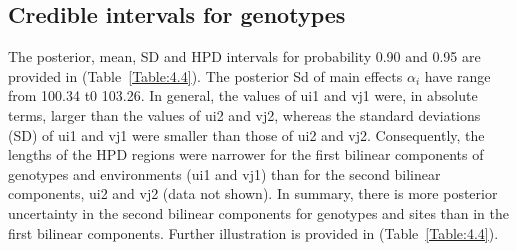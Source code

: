 \subsection{Credible intervals for genotypes}
The posterior, mean, SD and HPD intervals for probability 0.90 and 0.95 are provided in (Table~\ref{Table:4.4}). The posterior Sd of main effects $\alpha_i$ have range from 100.34 t0 103.26.
In general, the values of ui1 and vj1 were, in absolute terms, larger than the values
of ui2 and vj2, whereas the standard deviations (SD) of ui1 and vj1 were smaller than
those of ui2 and vj2. Consequently, the lengths of the HPD regions were narrower for the
first bilinear components of genotypes and environments (ui1 and vj1) than for the second
bilinear components, ui2 and vj2 (data not shown). In summary, there is more posterior
uncertainty in the second bilinear components for genotypes and sites than in the first
bilinear components. Further illustration is provided in (Table~\ref{Table:4.4}).
